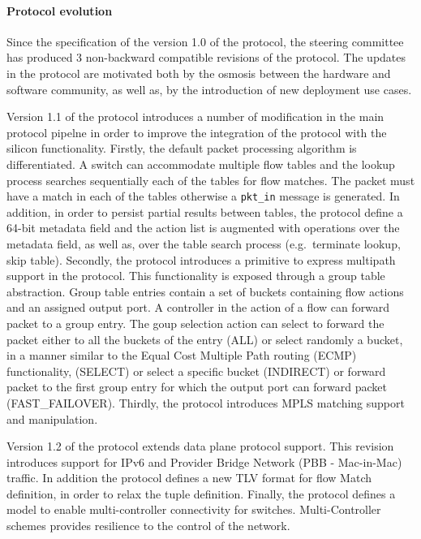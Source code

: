 \paragraph{Protocol evolution} 

Since the specification of the version 1.0 of the protocol, the \of steering
committee has produced 3 non-backward compatible revisions of the protocol. The
updates in the protocol are motivated both by the osmosis between the hardware
and software \of community, as well as, by the introduction of new deployment
use cases. 

Version 1.1 of the protocol introduces a number of modification in the main
protocol pipelne in order to improve the integration of the protocol with the
silicon functionality. Firstly, the default packet processing algorithm is
differentiated. A switch can accommodate multiple flow tables and the lookup
process searches sequentially each of the tables for flow matches. The packet
must have a match in each of the tables otherwise a {\tt pkt\_in} message is
generated. In addition, in order to persist partial results between tables, the
protocol define a 64-bit metadata field and the action list is augmented with
operations over the metadata field, as well as, over the table search process
(e.g.~terminate lookup, skip table).  Secondly, the protocol introduces a
primitive to express multipath support in the protocol. This functionality is
exposed through a group table abstraction.  Group table entries contain a set of
buckets containing flow actions and an assigned output port. A controller in the
action of a flow can forward packet to a group entry. The goup selection action
can select to forward the packet either to all the buckets of the entry (ALL) or
select randomly a bucket, in a manner similar to the Equal Cost Multiple Path
routing (ECMP)~\cite{RFC2992} functionality, (SELECT) or select a specific
bucket (INDIRECT) or forward packet to the first group entry for which the
output port can forward packet (FAST\_FAILOVER).  Thirdly, the protocol
introduces MPLS matching support and manipulation.

Version 1.2 of the protocol extends data plane protocol support. This revision
introduces support for IPv6 and Provider Bridge Network (PBB - Mac-in-Mac)
traffic. In addition the protocol defines a new TLV format for flow Match
definition, in order to relax the \of tuple definition.  Finally, the protocol
defines a model to enable multi-controller connectivity for switches.
Multi-Controller schemes provides resilience to the control of the network. 

